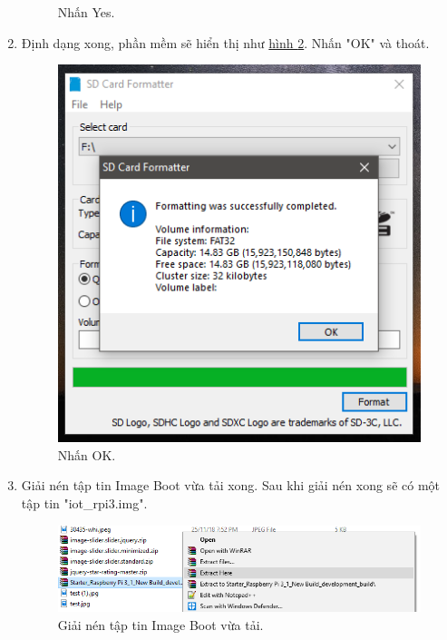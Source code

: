\begin{enumerate}
\begin{center}
\begin{figure}[htp]
\begin{center}
\end{center}
\caption{Nhấn Yes.}
\label{refhinh1}
\end{figure}
\end{center}
\item Định dạng xong, phần mềm sẽ hiển thị như  \hyperref[finishformat]{hình \ref*{finishformat}}. Nhấn "OK" và thoát.
\begin{center}
\begin{figure}[htp]
\begin{center}
\includegraphics[scale=0.7]{image3/buoc2cach1s5.png}
\end{center}
\caption{Nhấn OK.}
\label{finishformat}
\end{figure}
\end{center}
\item Giải nén tập tin Image Boot vừa tải xong. Sau khi giải nén xong sẽ có một tập tin "iot\_rpi3.img".
\begin{center}
\begin{figure}[htp]
\begin{center}
\includegraphics[scale=0.6]{image3/buoc2cach1s6.png}
\end{center}
\caption{Giải nén tập tin Image Boot vừa tải.}

\end{figure}
\end{center}
\end{enumerate}
